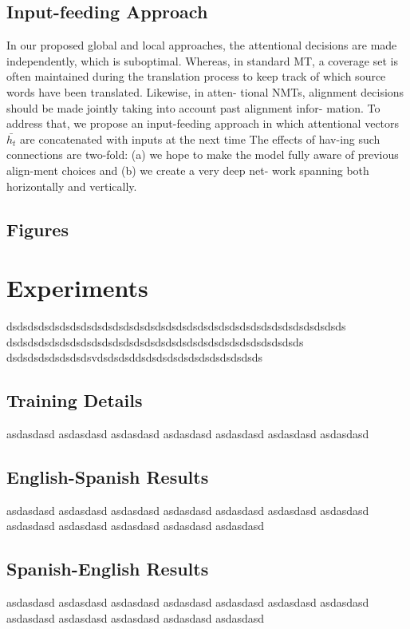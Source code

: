 \subsection{Input-feeding Approach}

In  our  proposed  global  and  local  approaches,
the attentional decisions are made independently,
which  is suboptimal.   Whereas,  in  standard  MT,
a coverage set  is  often  maintained  during  the
translation process to keep track of which source
words  have  been  translated.   Likewise,  in  atten-
tional NMTs, alignment decisions should be made
jointly  taking  into  account  past  alignment  infor-
mation.    To  address  that,  we  propose  an
input-feeding approach  in which attentional  vectors
$\bar{h_{t}}$ are concatenated with inputs at the next time
The  effects  of  hav-ing  such  connections  are  two-fold:  (a)  we  hope
to make the model fully aware of previous align-ment choices  and (b) we create a very deep net-
work spanning both horizontally and vertically.


\subsection{Figures}


\section{Experiments}
dsdsdsdsdsdsdsdsdsdsdsdsdsdsdsdsdsdsdsdsdsdsdsdsdsdsdsdsdsdsdsds
dsdsdsdsdsdsdsdsdsdsdsdsdsdsdsdsdsdsdsdsdsdsdsdsdsdsdsds
dsdsdsdsdsdsdsdsvdsdsdsddsdsdsdsdsdsdsdsdsdsdsds

\subsection{Training Details}
asdasdasd asdasdasd
asdasdasd
asdasdasd
asdasdasd
asdasdasd
asdasdasd

\subsection{English-Spanish Results}
asdasdasd asdasdasd
asdasdasd
asdasdasd
asdasdasd
asdasdasd
asdasdasd asdasdasd
asdasdasd
asdasdasd
asdasdasd
asdasdasd

\subsection{Spanish-English Results}
asdasdasd asdasdasd
asdasdasd
asdasdasd
asdasdasd
asdasdasd
asdasdasd asdasdasd
asdasdasd
asdasdasd
asdasdasd
asdasdasd

